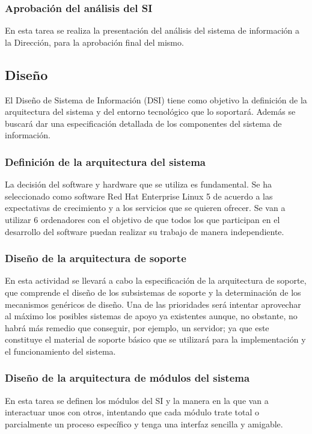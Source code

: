 \documentclass[11pt,a4paper,spanish,twoside]{book}
\begin{document}
\subsubsection{Aprobación del análisis del SI}
En esta tarea se realiza la presentación del análisis del sistema de
información a la Dirección, para la aprobación final del mismo.

\subsection{Diseño}
El Diseño de Sistema de Información (DSI) tiene como objetivo la definición
de la arquitectura del sistema y del entorno tecnológico que lo soportará. 
Además se buscará dar una especificación detallada de los componentes del 
sistema de información.

\subsubsection{Definición de la arquitectura del sistema}
La decisión del software y hardware que se utiliza es fundamental. Se ha
seleccionado como software Red Hat Enterprise Linux 5 de acuerdo a las
expectativas de crecimiento y a los servicios que se quieren ofrecer. Se
van a utilizar 6 ordenadores con el objetivo de que todos los que participan
en el desarrollo del software puedan realizar su trabajo de manera 
independiente. 
 
\subsubsection{Diseño de la arquitectura de soporte}
En esta actividad se llevará a cabo la especificación de la arquitectura de 
soporte, que comprende el diseño de los subsistemas de soporte y la 
determinación de los mecanismos genéricos de diseño. Una de las prioridades 
será intentar aprovechar al máximo los posibles sistemas de apoyo ya existentes
aunque, no obstante, no habrá más remedio que conseguir, por ejemplo, un 
servidor; ya que este constituye el material de soporte básico que se utilizará
para la implementación y el funcionamiento del sistema.

\subsubsection{Diseño de la arquitectura de módulos del sistema}
En esta tarea se definen los módulos del SI y la manera en la que van a 
interactuar unos con otros, intentando que cada módulo trate total o 
parcialmente un proceso específico y tenga una interfaz sencilla y amigable.
\end{document}
